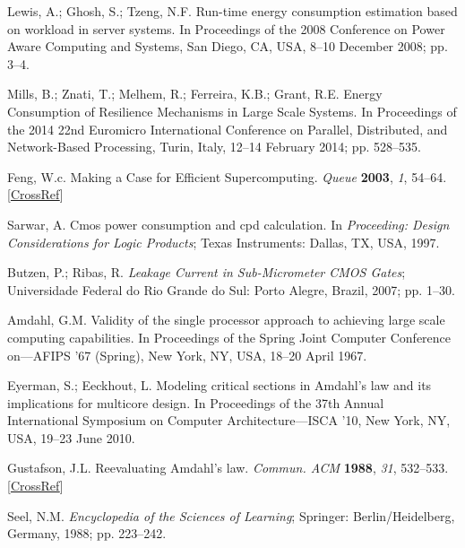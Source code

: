 \begin{thebibliography}{999}
	Lewis, A.; Ghosh, S.; Tzeng, N.F. Run-time energy consumption estimation based on workload in server systems. {In Proceedings of the 2008 Conference on Power Aware Computing and Systems, San Diego, CA, USA, 8--10 December 2008}; pp. 3--4.
	
	Mills, B.; Znati, T.; Melhem, R.; Ferreira, K.B.; Grant, R.E. Energy Consumption of Resilience Mechanisms in Large Scale Systems. In Proceedings of the 2014 22nd Euromicro International Conference on Parallel, Distributed, and Network-Based Processing, Turin, Italy, 12--14 February 2014;  pp. 528--535.
	
	Feng, W.c. Making a Case for Efficient Supercomputing. {\em Queue} {\bf 2003}, {\em 1}, 54--64. [\href{http://dx.doi.org/10.1145/957717.957772}{CrossRef}]
	
	Sarwar, A. Cmos power consumption and cpd calculation. In {\em Proceeding: Design Considerations for Logic Products};  Texas Instruments: Dallas, TX, USA, {1997}.
	
	Butzen, P.; Ribas, R. {\em Leakage Current in Sub-Micrometer CMOS Gates}; {Universidade Federal do Rio Grande do Sul}: Porto Alegre, Brazil, { 2007}; pp. 1--30.
	
	Amdahl, G.M. {Validity of the single processor approach to achieving large scale computing capabilities}. In Proceedings of the Spring Joint Computer Conference on---AFIPS '67 (Spring), New York, NY, USA, 18--20 April 1967.
	
	Eyerman, S.; Eeckhout, L. {Modeling critical sections in Amdahl's law and its implications for multicore design}. In Proceedings of the 37th Annual International Symposium on Computer Architecture---ISCA '10, New York, NY, USA, 19--23 June 2010.
	
	Gustafson, J.L. Reevaluating Amdahl's law. {\em Commun. ACM} {\bf 1988}, {\em 31}, 532--533. [\href{http://dx.doi.org/10.1145/42411.42415}{CrossRef}]
	
	Seel, N.M. \emph{Encyclopedia of the Sciences of Learning}; {Springer:  {Berlin/Heidelberg, Germany,} %
	} {1988}; pp. 223--242.
	

\end{thebibliography}
